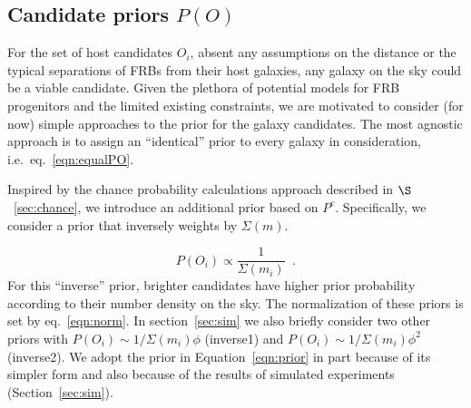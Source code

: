 \documentclass[twocolumn,linenumbers]{aastex63}
\newcommand{\mgmag}{m}
\newcommand{\mnhalf}{n_{1/2}} %
\newcommand{\nnhalf}{10}  %
\newcommand{\mhalflight}{\phi} %
\newcommand{\mpchance}{P^c}
\newcommand{\pchance}{$\mpchance$}
\newcommand{\mipchance}{\mpchance_i}
\newcommand{\mnumden}{\Sigma(\mgmag)}
\newcommand{\numden}{$\mnumden$}
\newcommand{\minumden}{\Sigma(\mgmag_i)}
\newcommand{\mPO}{P(O)}  %
\newcommand{\PO}{$\mPO$}
\newcommand{\mPOi}{P(O_i)}  %
\newcommand{\mPU}{P(U)}  %
\newcommand{\PU}{$\mPU$}
\begin{document}

\subsection{Candidate priors \PO}
\label{sec:candidate_priors}

For the set of host candidates $O_i$,
absent any assumptions on the distance or the typical
separations of FRBs from their host galaxies,
any galaxy on the sky could be a viable candidate.
Given the plethora of potential models for FRB progenitors
and the limited existing constraints, we are motivated
to consider (for now) simple approaches to the prior for the
galaxy candidates.
The most agnostic approach is to assign an ``identical''
prior to every galaxy in consideration, 
i.e.\ eq.~\ref{eqn:equalPO}.

Inspired by the chance probability calculations
approach described in $\S$~\ref{sec:chance}, 
we introduce an
additional prior based on \pchance. 
Specifically,  we consider a prior that inversely weights by \numden.

\begin{equation}
\mPOi \propto \frac{1}{\minumden} \;\; .
\label{eqn:prior}
\end{equation}
For this ``inverse'' prior, 
brighter candidates have higher prior probability
according to their number density on the sky.
The normalization of these priors is set by 
eq.~\ref{eqn:norm}.
In section~\ref{sec:sim} we also briefly consider
two other priors with 
$\mPOi \sim 1/\minumden \phi$ (inverse1)
and
$\mPOi \sim 1/\minumden \phi^2$ (inverse2).
We adopt the prior in Equation~\ref{eqn:prior}
in part because of its simpler form and also 
because of the results of simulated experiments
(Section~\ref{sec:sim}).
%
\end{document}

